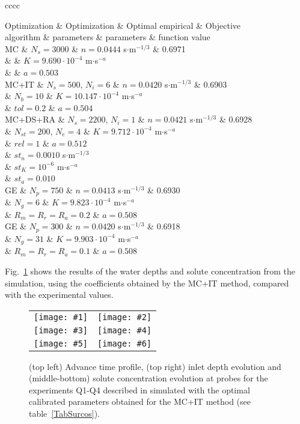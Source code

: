 \documentclass[review,authoryear]{elsarticle}
\newcommand{\TABLE}[5]
{
	\begin{table}[ht!]
		\centering
		\caption{#4.\label{#5}}
		#1
		\tabulinesep=0.9mm
		\begin{tabu}{#2}
			#3
		\end{tabu}
	\end{table}
}
\newcommand{\FIGVI}[8]
{
	\begin{figure}[ht!]
		\centering
		\begin{tabular}{cc}
			\texttt{[image: \#1]} & \texttt{[image: \#2]} \\
			\texttt{[image: \#3]} & \texttt{[image: \#4]} \\
			\texttt{[image: \#5]} & \texttt{[image: \#6]}
		\end{tabular}
		\caption{#7.\label{#8}}
	\end{figure}
}
\begin{document}
\TABLE{\footnotesize}{cccc}
{
	Optimization & Optimization & Optimal empirical & Objective
	\\ algorithm & parameters & parameters & function value
	\\ \hline
	MC & $N_s=3000$ & $n=0.0444$ s$\cdot$m$^{-1/3}$ & 0.6971
	\\ & & $K=9.690\cdot 10^{-4}$ m$\cdot$s$^{-a}$
	\\ & & $a=0.503$
	\\ \hline
	MC+IT & $N_s=500$, $N_i=6$ & $n=0.0420$ s$\cdot$m$^{-1/3}$ & 0.6903
	\\ & $N_b=10$ & $K=10.147\cdot 10^{-4}$ m$\cdot$s$^{-a}$
	\\ & $tol=0.2$ & $a=0.504$
	\\ \hline
	MC+DS+RA & $N_s=2200$, $N_i=1$ & $n=0.0421$ s$\cdot$m$^{-1/3}$ & 0.6928
	\\ & $N_{st}=200$, $N_e=4$ & $K=9.712\cdot 10^{-4}$ m$\cdot$s$^{-a}$
	\\ & $rel=1$ & $a=0.512$
	\\ & $st_n=0.0010$ s$\cdot$m$^{-1/3}$
	\\ & $st_K=10^{-6}$ m$\cdot$s$^{-a}$
	\\ & $st_a=0.010$
	\\ \hline
	GE & $N_p=750$ & $n=0.0413$ s$\cdot$m$^{-1/3}$  & 0.6930
	\\ & $N_g=6$ & $K=9.823\cdot 10^{-4}$ m$\cdot$s$^{-a}$
	\\ & $R_m=R_r=R_a=0.2$ & $a=0.508$
	\\ \hline
	GE & $N_p=300$ & $n=0.0420$ s$\cdot$m$^{-1/3}$  & 0.6918
	\\ & $N_g=31$ & $K=9.903\cdot 10^{-4}$ m$\cdot$s$^{-a}$
	\\ & $R_m=R_r=R_a=0.1$ & $a=0.508$
	\\ \hline
}{Optimal empirical parameters and value of the evaluation function in the simulation of the furrow irrigation cases in \citet{JaviSurcos2} using program SURCOS and several optimization algorithms in MPCOTool with the same total number of simulations ($N_{total}=3000$)}{TabSurcos}

Fig.~\ref{FigSurcos} shows the results of the water depths and solute concentration from the simulation, using the coefficients obtained by the MC+IT method, compared with the experimental values.

\FIGVI{surcos-advance.eps}{surcos-depth.eps}{surcos-solute-q1.eps}
{surcos-solute-q2.eps}{surcos-solute-q3.eps}{surcos-solute-q4.eps}
{(top left) Advance time profile, (top right) inlet depth evolution and
(middle-bottom) solute concentration evolution at probes for the experiments
Q1-Q4 described in \citet{JaviSurcos2} simulated with the optimal calibrated
parameters obtained for the MC+IT method (see table~\ref{TabSurcos})}{FigSurcos}
\end{document}
